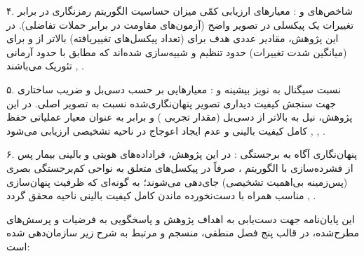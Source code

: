 

۴. شاخص‌های  و : معیارهای ارزیابی کمّی میزان حساسیت الگوریتم رمزنگاری در برابر تغییرات یک پیکسلی در تصویر واضح (آزمون‌های مقاومت در برابر حملات تفاضلی). در این پژوهش، مقادیر عددی هدف برای  (تعداد پیکسل‌های تغییریافته) بالاتر از  و برای  (میانگین شدت تغییرات) حدود  تنظیم و شبیه‌سازی شده‌اند که مطابق با حدود آرمانی تئوریک می‌باشند , .\par



۵. نسبت سیگنال به نویز بیشینه  و : معیارهایی بر حسب دسی‌بل و ضریب ساختاری جهت سنجش کیفیت دیداری تصویر پنهان‌نگاری‌شده نسبت به تصویر اصلی. در این پژوهش، نیل به  بالاتر از  دسی‌بل (مقدار تجربی ) و  برابر  به عنوان معیار عملیاتی حفظ کامل کیفیت بالینی و عدم ایجاد اعوجاج در ناحیه تشخیصی  ارزیابی می‌شود , , .\par



۶. پنهان‌نگاری آگاه به برجستگی : در این پژوهش، فراداده‌های هویتی و بالینی بیمار پس از فشرده‌سازی با الگوریتم ، صرفاً در پیکسل‌های متعلق به نواحی کم‌برجستگی بصری (پس‌زمینه بی‌اهمیت تشخیصی) جای‌دهی می‌شوند؛ به گونه‌ای که ظرفیت پنهان‌سازی مناسب همراه با دست‌نخورده ماندن کامل کیفیت بالینی ناحیه  محقق گردد , .\par





این پایان‌نامه جهت دست‌یابی به اهداف پژوهش و پاسخگویی به فرضیات و پرسش‌های مطرح‌شده، در قالب پنج فصل منطقی، منسجم و مرتبط به شرح زیر سازمان‌دهی شده است:\par



